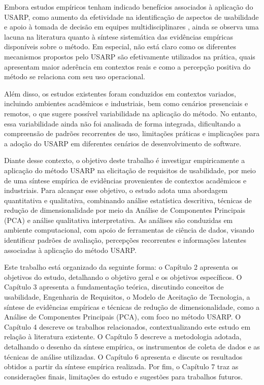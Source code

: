 Embora estudos empíricos tenham indicado benefícios associados à aplicação do USARP, como aumento da efetividade na identificação de aspectos de usabilidade e apoio à tomada de decisão em equipes multidisciplinares \cite{marques2022}, ainda se observa uma lacuna na literatura quanto à síntese sistemática das evidências empíricas disponíveis sobre o método. Em especial, não está claro como os diferentes mecanismos propostos pelo USARP são efetivamente utilizados na prática, quais apresentam maior aderência em contextos reais e como a percepção positiva do método se relaciona com seu uso operacional.

Além disso, os estudos existentes foram conduzidos em contextos variados, incluindo ambientes acadêmicos e industriais, bem como cenários presenciais e remotos, o que sugere possível variabilidade na aplicação do método. No entanto, essa variabilidade ainda não foi analisada de forma integrada, dificultando a compreensão de padrões recorrentes de uso, limitações práticas e implicações para a adoção do USARP em diferentes cenários de desenvolvimento de software.

Diante desse contexto, o objetivo deste trabalho é investigar empiricamente a aplicação do método USARP na elicitação de requisitos de usabilidade, por meio de uma síntese empírica de evidências provenientes de contextos acadêmicos e industriais. Para alcançar esse objetivo, o estudo adota uma abordagem quantitativa e qualitativa, combinando análise estatística descritiva, técnicas de redução de dimensionalidade por meio da Análise de Componentes Principais (PCA) e análise qualitativa interpretativa. As análises são conduzidas em ambiente computacional, com apoio de ferramentas de ciência de dados, visando identificar padrões de avaliação, percepções recorrentes e informações latentes associadas à aplicação do método USARP.

Este trabalho está organizado da seguinte forma: o Capítulo 2 apresenta os objetivos do estudo, detalhando o objetivo geral e os objetivos específicos. O Capítulo 3 apresenta a fundamentação teórica, discutindo conceitos de usabilidade, Engenharia de Requisitos, o Modelo de Aceitação de Tecnologia, a síntese de evidências empíricas e técnicas de redução de dimensionalidade, como a Análise de Componentes Principais (PCA), com foco no método USARP. O Capítulo 4 descreve os trabalhos relacionados, contextualizando este estudo em relação à literatura existente. O Capítulo 5 descreve a metodologia adotada, detalhando o desenho da síntese empírica, os instrumentos de coleta de dados e as técnicas de análise utilizadas. O Capítulo 6 apresenta e discute os resultados obtidos a partir da síntese empírica realizada. Por fim, o Capítulo 7 traz as considerações finais, limitações do estudo e sugestões para trabalhos futuros.

